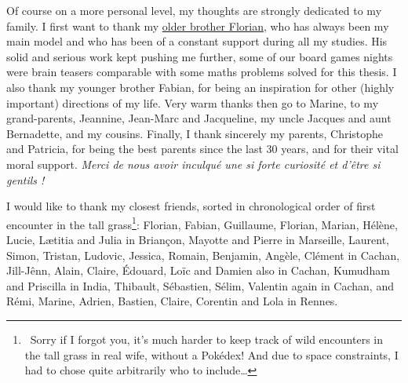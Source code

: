 \begin{acknowledgements}
Of course on a more personal level, my thoughts are strongly dedicated to my family.
%
I first want to thank my \href{https://paris-sorbonne.academia.edu/FBesson}{older brother Florian}, who has always been my main model and who has been of a constant support during all my studies. His solid and serious work kept pushing me further, some of our board games nights were brain teasers comparable with some maths problems solved for this thesis.
%
I also thank my younger brother Fabian, for being an inspiration for other (highly important) directions of my life.
Very warm thanks then go to Marine, to my grand-parents, Jeannine, Jean-Marc and Jacqueline, my uncle Jacques and aunt Bernadette, and my cousins.
Finally, I thank sincerely my parents, Christophe and Patricia, for being the best parents since the last 30 years, and for their vital moral support. \emph{Merci de nous avoir inculqué une si forte curiosité et d'être si gentils !}

I would like to thank my closest friends, sorted in chronological order of first encounter in the tall grass\footnote{~Sorry if I forgot you, it's much harder to keep track of wild encounters in the tall grass in real wife, without a Pokédex! And due to space constraints, I had to chose quite arbitrarily who to include\dots}: Florian, Fabian, Guillaume, Florian, Marian, Hélène, Lucie, Lætitia and Julia in Briançon, Mayotte and Pierre in Marseille, Laurent, Simon, Tristan, Ludovic, Jessica, Romain, Benjamin, Angèle, Clément in Cachan, Jill-Jênn, Alain, Claire, Édouard, Loïc and Damien also in Cachan, Kumudham and Priscilla in India, Thibault, Sébastien, Sélim, Valentin again in Cachan, and Rémi, Marine, Adrien, Bastien, Claire, Corentin and Lola in Rennes.


\end{acknowledgements}
